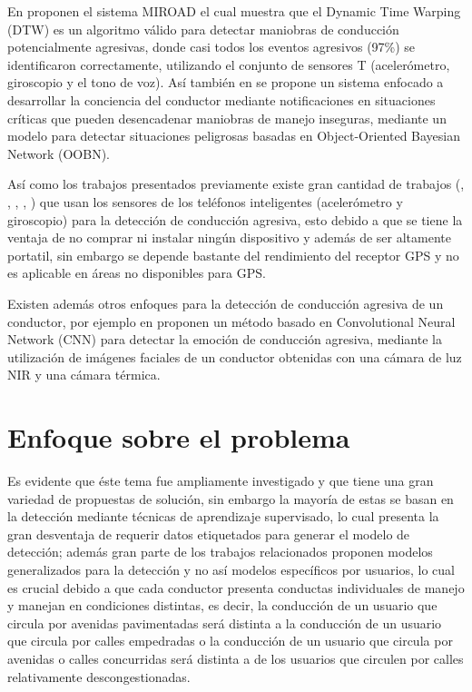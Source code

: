 \vspace{5mm} %

En \cite{23} proponen el sistema MIROAD el cual muestra que el Dynamic Time Warping (DTW) es un algoritmo válido para detectar maniobras de conducción potencialmente agresivas, donde casi todos los eventos agresivos (97\%) se identificaron correctamente, utilizando el conjunto de sensores T (aceler\'{o}metro, giroscopio y el tono de voz). As\'{i} tambi\'{e}n en \cite{24} se propone un sistema enfocado a desarrollar la conciencia del conductor mediante notificaciones en situaciones críticas que pueden desencadenar maniobras de manejo inseguras, mediante un modelo para detectar situaciones peligrosas basadas en Object-Oriented Bayesian Network (OOBN).

\vspace{5mm} %

As\'{i} como los trabajos presentados previamente existe gran cantidad de trabajos (\cite{25}, \cite{26}, \cite{27}, \cite{28}, \cite{29}) que usan los sensores de los tel\'{e}fonos inteligentes (aceler\'{o}metro y giroscopio) para la detecci\'{o}n de conducci\'{o}n agresiva, esto debido a que se tiene la ventaja de no comprar ni instalar ning\'{u}n dispositivo y adem\'{a}s de ser altamente portatil, sin embargo se depende bastante del rendimiento del receptor GPS y no es aplicable en \'{a}reas no disponibles para GPS.

\vspace{5mm} %

Existen adem\'{a}s otros enfoques para la detecci\'{o}n de conducci\'{o}n agresiva de un conductor, por ejemplo en \cite{22} proponen un método basado en Convolutional Neural Network (CNN) para detectar la emoción de conducción agresiva, mediante la utilizaci\'{o}n de imágenes faciales de un conductor obtenidas con una cámara de luz NIR y una cámara térmica.

\section{Enfoque sobre el problema}

Es evidente que \'{e}ste tema fue ampliamente investigado y que tiene una gran variedad de propuestas de soluci\'{o}n, sin embargo la mayor\'{i}a de estas se basan en la detecci\'{o}n mediante t\'{e}cnicas de aprendizaje supervisado, lo cual presenta la gran desventaja de requerir datos etiquetados para generar el modelo de detecci\'{o}n; adem\'{a}s gran parte de los trabajos relacionados proponen modelos generalizados para la detecci\'{o}n y no as\'{i} modelos espec\'{i}ficos por usuarios, lo cual es crucial debido a que cada conductor presenta conductas individuales de manejo y manejan en condiciones distintas, es decir, la conducci\'{o}n de un usuario que circula por avenidas pavimentadas ser\'{a} distinta a la conducci\'{o}n de un usuario que circula por calles empedradas o la conducci\'{o}n de un usuario que circula por avenidas o calles concurridas ser\'{a} distinta a de los usuarios que circulen por calles relativamente descongestionadas.

